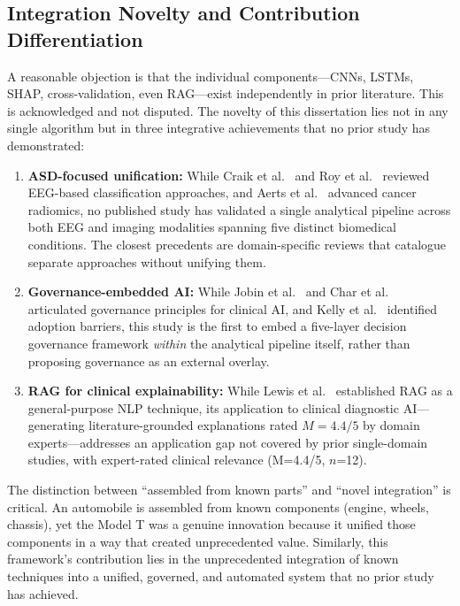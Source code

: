 \subsection{Integration Novelty and Contribution Differentiation}

A reasonable objection is that the individual components---CNNs, LSTMs, SHAP, cross-validation, even RAG---exist independently in prior literature. This is acknowledged and not disputed. The novelty of this dissertation lies not in any single algorithm but in three integrative achievements that no prior study has demonstrated:

\begin{enumerate}
    \item \textbf{ASD-focused unification:} While Craik et al.~\cite{craik2019eeg} and Roy et al.~\cite{roy2019eeg} reviewed EEG-based classification approaches, and Aerts et al.~\cite{aerts2014radiomics} advanced cancer radiomics, no published study has validated a single analytical pipeline across both EEG and imaging modalities spanning five distinct biomedical conditions. The closest precedents are domain-specific reviews that catalogue separate approaches without unifying them.

    \item \textbf{Governance-embedded AI:} While Jobin et al.~\cite{jobin2019ethics} and Char et al.~\cite{char2018ethics} articulated governance principles for clinical AI, and Kelly et al.~\cite{kelly2019healthcare} identified adoption barriers, this study is the first to embed a five-layer decision governance framework \textit{within} the analytical pipeline itself, rather than proposing governance as an external overlay.

    \item \textbf{RAG for clinical explainability:} While Lewis et al.~\cite{lewis2020rag} established RAG as a general-purpose NLP technique, its application to clinical diagnostic AI---generating literature-grounded explanations rated $M = 4.4/5$ by domain experts---addresses an application gap not covered by prior single-domain studies, with expert-rated clinical relevance (M=4.4/5, $n$=12).
\end{enumerate}

The distinction between ``assembled from known parts'' and ``novel integration'' is critical. An automobile is assembled from known components (engine, wheels, chassis), yet the Model T was a genuine innovation because it unified those components in a way that created unprecedented value. Similarly, this framework's contribution lies in the unprecedented integration of known techniques into a unified, governed, and automated system that no prior study has achieved.

